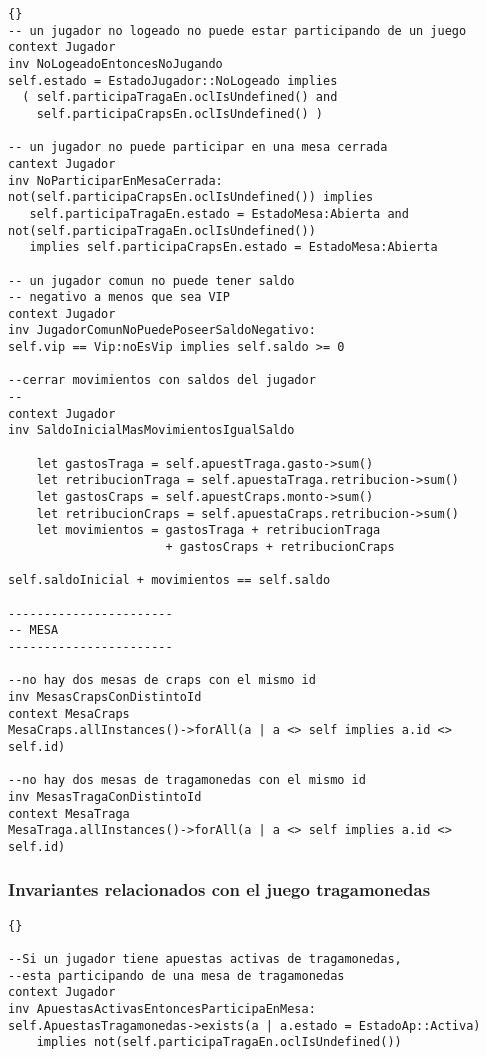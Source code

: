 \begin{framed}
\begin{lstlisting}[frame=trbl]{}
-- un jugador no logeado no puede estar participando de un juego
context Jugador
inv NoLogeadoEntoncesNoJugando
self.estado = EstadoJugador::NoLogeado implies 
  ( self.participaTragaEn.oclIsUndefined() and 
    self.participaCrapsEn.oclIsUndefined() )

-- un jugador no puede participar en una mesa cerrada
cantext Jugador
inv NoParticiparEnMesaCerrada:
not(self.participaCrapsEn.oclIsUndefined()) implies 
   self.participaTragaEn.estado = EstadoMesa:Abierta and
not(self.participaTragaEn.oclIsUndefined()) 
   implies self.participaCrapsEn.estado = EstadoMesa:Abierta
      
-- un jugador comun no puede tener saldo 
-- negativo a menos que sea VIP
context Jugador
inv JugadorComunNoPuedePoseerSaldoNegativo:
self.vip == Vip:noEsVip implies self.saldo >= 0

--cerrar movimientos con saldos del jugador
--
context Jugador
inv SaldoInicialMasMovimientosIgualSaldo

    let gastosTraga = self.apuestTraga.gasto->sum()
    let retribucionTraga = self.apuestaTraga.retribucion->sum()
    let gastosCraps = self.apuestCraps.monto->sum()
    let retribucionCraps = self.apuestaCraps.retribucion->sum()
    let movimientos = gastosTraga + retribucionTraga
                      + gastosCraps + retribucionCraps
    
self.saldoInicial + movimientos == self.saldo

-----------------------
-- MESA
-----------------------

--no hay dos mesas de craps con el mismo id
inv MesasCrapsConDistintoId
context MesaCraps
MesaCraps.allInstances()->forAll(a | a <> self implies a.id <> self.id)

--no hay dos mesas de tragamonedas con el mismo id
inv MesasTragaConDistintoId
context MesaTraga
MesaTraga.allInstances()->forAll(a | a <> self implies a.id <> self.id)

\end{lstlisting}

\subsubsection{Invariantes relacionados con el juego tragamonedas}
\lstset{language=ocl}
\lstset{commentstyle=\textit}
\begin{lstlisting}[frame=trbl]{}

--Si un jugador tiene apuestas activas de tragamonedas,
--esta participando de una mesa de tragamonedas
context Jugador
inv ApuestasActivasEntoncesParticipaEnMesa:
self.ApuestasTragamonedas->exists(a | a.estado = EstadoAp::Activa)
    implies not(self.participaTragaEn.oclIsUndefined())


\end{lstlisting}
\end{framed}
